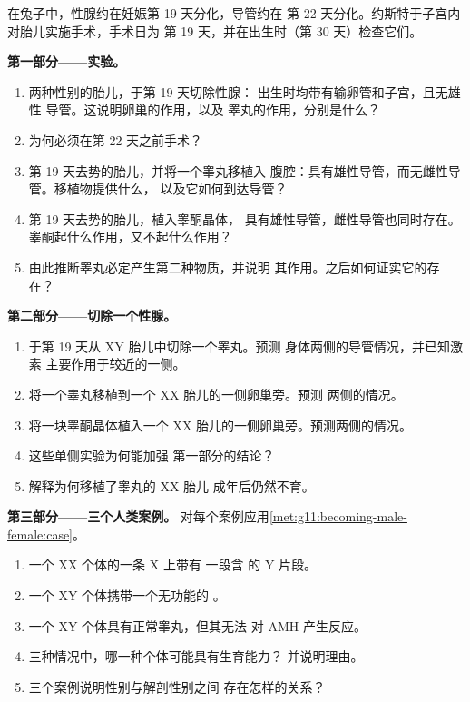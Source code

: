 \begin{problem}
\label{pb:g11:becoming-male-female:1}
在兔子中，性腺约在妊娠第 19 天分化，导管约在
第 22 天分化。约斯特于子宫内对胎儿实施手术，手术日为
第 19 天，并在出生时（第 30 天）检查它们。

\medskip
\noindent\textbf{第一部分——实验。}
\begin{enumerate}
  \item 两种性别的胎儿，于第 19 天切除性腺：
        出生时均带有输卵管和子宫，且无雄性
        导管。这说明卵巢的作用，以及
        睾丸的作用，分别是什么？
  \item 为何必须在第 22 天之前手术？
  \item 第 19 天去势的胎儿，并将一个睾丸移植入
        腹腔：具有雄性导管，而无雌性导管。移植物提供什么，
        以及它如何到达导管？
  \item 第 19 天去势的胎儿，植入睾酮晶体，
        具有雄性导管，雌性导管也同时存在。
        睾酮起什么作用，又不起什么作用？
  \item 由此推断睾丸必定产生第二种物质，并说明
        其作用。之后如何证实它的存在？
\end{enumerate}

\medskip
\noindent\textbf{第二部分——切除一个性腺。}
\begin{enumerate}[resume]
  \item 于第 19 天从 XY 胎儿中切除一个睾丸。预测
        身体两侧的导管情况，并已知激素
        主要作用于较近的一侧。
  \item 将一个睾丸移植到一个 XX 胎儿的一侧卵巢旁。预测
        两侧的情况。
  \item 将一块睾酮晶体植入一个
        XX 胎儿的一侧卵巢旁。预测两侧的情况。
  \item 这些单侧实验为何能加强
        第一部分的结论？
  \item 解释为何移植了睾丸的 XX 胎儿
        成年后仍然不育。
\end{enumerate}

\medskip
\noindent\textbf{第三部分——三个人类案例。}
对每个案例应用\cref{met:g11:becoming-male-female:case}。
\begin{enumerate}[resume]
  \item 一个 XX 个体的一条 X 上带有
        一段含  的 Y 片段。
  \item 一个 XY 个体携带一个无功能的 。
  \item 一个 XY 个体具有正常睾丸，但其无法
        对 AMH 产生反应。
  \item 三种情况中，哪一种个体可能具有生育能力？
        并说明理由。
  \item 三个案例说明性别与解剖性别之间
        存在怎样的关系？
\end{enumerate}


\end{problem}
